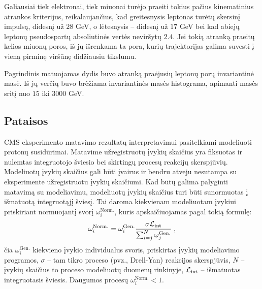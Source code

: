 \documentclass[a4paper, 12pt, oneside]{article}
\newcommand{\Lumi}{{\cal L}_\mathrm{int}}
\newlength\q
\begin{document}
Galiausiai tiek elektronai, tiek miuonai turėjo praeiti tokius pačius kinematinius atrankos kriterijus,
reikalaujančius, kad greitesnysis leptonas turėtų skersinį impulsą, didesnį už $28$ GeV, o lėtesnysis --
didesnį už $17$ GeV bei kad abiejų leptonų pseudospartų absoliutinės vertės neviršytų $2.4$.
Jei tokią atranką praeitų kelios miuonų poros, iš jų išrenkama ta pora, kurių trajektorijas galima suvesti į
vieną pirminę viršūnę didžiausiu tikslumu.

Pagrindinis matuojamas dydis buvo atranką praėjusių leptonų porų invariantinė masė.
Iš jų verčių buvo brėžiama invariantinės masės histograma, apimanti masės sritį nuo $15$ iki $3000$ GeV.

\subsection{Pataisos}\label{sec:corrections}
CMS eksperimento matavimo rezultatų interpretavimui pasitelkiami modeliuoti protonų susidūrimai.
Matavime užregistruotų įvykių skaičius yra fiksuotas ir nulemtas integruotojo šviesio bei skirtingų
procesų reakcijų skerspjūvių.
Modeliuotų įvykių skaičius gali būti įvairus ir bendru atveju nesutampa su eksperimente užregistruotu
įvykių skaičiumi.
Kad būtų galima palyginti matavimą su modeliavimu, modeliuotų įvykių skaičius turi būti sunormuotas
į išmatuotą integruotąjį šviesį.
Tai daroma kiekvienam modeliuotam įvykiui priskiriant normuojantį svorį $\omega_{i}^{\mathrm{Norm.}}$,
kuris apskaičiuojamas pagal tokią formulę:
\begin{equation}
	\omega_{i}^{\mathrm{Norm.}} = \omega_{i}^{\mathrm{Gen.}} \frac{ \sigma\Lumi }{ \sum_{i=j}^{N}\omega_{j}^{\mathrm{Gen.}} } \; ,
	\label{eq:NLOweight}
\end{equation}
čia $\omega_{i}^{\mathrm{Gen.}}$ kiekvieno įvykio individualus svoris, priskirtas įvykių modeliavimo programos,
$\sigma$ -- tam tikro proceso (pvz., Drell-Yan) reakcijos skerspjūvis, $N$ -- įvykių skaičius to
proceso modeliuotų duomenų rinkinyje, $\Lumi$ -- išmatuotas integruotasis šviesis.
Daugumos procesų $\omega_{i}^{\mathrm{Norm.}}<1$.
\end{document}
